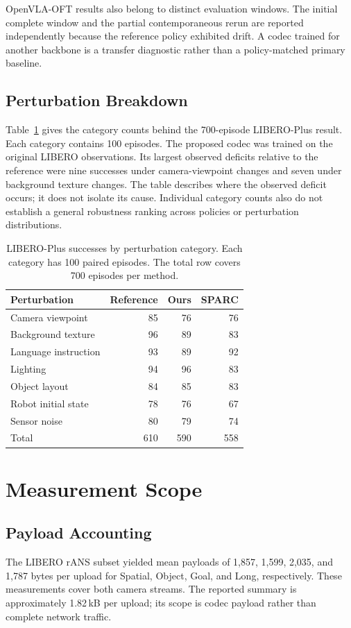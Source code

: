 OpenVLA-OFT results also belong to distinct evaluation windows. The
initial complete window and the partial contemporaneous rerun are
reported independently because the reference policy exhibited drift.
A codec trained for another backbone is a transfer diagnostic rather
than a policy-matched primary baseline.

\subsection{Perturbation Breakdown}
Table~\ref{tab:appendix-perturbations} gives the category counts behind
the 700-episode LIBERO-Plus result. Each category contains 100 episodes.
The proposed codec was trained on the original LIBERO observations.
Its largest observed deficits relative to the reference were nine
successes under camera-viewpoint changes and seven under background
texture changes. The table describes where the observed deficit occurs;
it does not isolate its cause. Individual category counts also do not
establish a general robustness ranking across policies or perturbation
distributions.

\begin{table}[t]
\caption{LIBERO-Plus successes by perturbation category. Each category
has 100 paired episodes. The total row covers 700 episodes per method.}
\label{tab:appendix-perturbations}
\centering\small
\setlength{\tabcolsep}{4pt}
\begin{tabularx}{\columnwidth}{Xrrr}
\toprule
Perturbation & Reference & Ours & SPARC \\
\midrule
Camera viewpoint & 85 & 76 & 76 \\
Background texture & 96 & 89 & 83 \\
Language instruction & 93 & 89 & 92 \\
Lighting & 94 & 96 & 83 \\
Object layout & 84 & 85 & 83 \\
Robot initial state & 78 & 76 & 67 \\
Sensor noise & 80 & 79 & 74 \\
\midrule
Total & 610 & 590 & 558 \\
\bottomrule
\end{tabularx}
\end{table}

\section{Measurement Scope}
\label{app:measurement}
\subsection{Payload Accounting}
The LIBERO rANS subset yielded mean payloads of 1,857, 1,599, 2,035,
and 1,787 bytes per upload for Spatial, Object, Goal, and Long,
respectively. These measurements cover both camera streams. The
reported summary is approximately 1.82\,kB per upload; its scope is
codec payload rather than complete network traffic.

